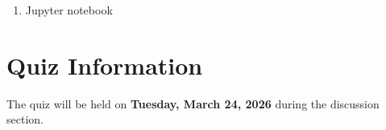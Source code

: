 \documentclass[reqno, answers]{exam}
\begin{document}
\begin{enumerate}
\begin{solution}
              Since $f(t_k) = y_k$, we have:
              $$f(x) = y_k + (x - t_k)f'(s)$$

              \textbf{(b)} The piecewise linear interpolant satisfies:
              $$p_n(x) = y_k + (x - t_k)\frac{y_{k+1} - y_k}{t_{k+1} - t_k}$$

              Apply the mean value theorem to $f$ on $[t_k, t_{k+1}]$:
              $$f(t_{k+1}) - f(t_k) = (t_{k+1} - t_k)f'(u)$$
              for some $u \in (t_k, t_{k+1})$, so:
              $$f'(u) = \frac{y_{k+1} - y_k}{t_{k+1} - t_k}$$

              Now apply the mean value theorem to $f'$ on the interval with endpoints $s$ and $u$:
              $$f''(v) = \frac{f'(s) - f'(u)}{s - u}$$
              for some $v$ between $s$ and $u$, hence $v \in (t_k, t_{k+1})$.

              This gives:
              $$f'(s) - \frac{y_{k+1} - y_k}{t_{k+1} - t_k} = (s - u)f''(v)$$

              \textbf{(c)} From parts (a) and (b):
              \begin{align*}
                  f(x) - p_n(x) & = y_k + (x - t_k)f'(s) - y_k - (x - t_k)\frac{y_{k+1} - y_k}{t_{k+1} - t_k} \\
                                & = (x - t_k)\left[f'(s) - \frac{y_{k+1} - y_k}{t_{k+1} - t_k}\right]         \\
                                & = (x - t_k)(s - u)f''(v)
              \end{align*}

              Taking absolute values and using $|f''(v)| \leq M = \|f''\|_\infty$:
              $$|f(x) - p_n(x)| \leq |x - t_k| \cdot |s - u| \cdot M$$

              Since $x, s, u \in (t_k, t_{k+1})$, we have $|x - t_k| < h$ and $|s - u| < h$.

              Therefore:
              $$\|f - p_n\|_\infty \leq Mh^2$$
          \end{solution}

    \item Jupyter notebook

\end{enumerate}


\section*{Quiz Information}

The quiz will be held on {\bf Tuesday, March 24, 2026} during the discussion section.
\end{document}
